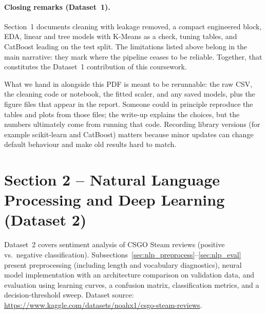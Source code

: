 \documentclass[12pt,a4paper]{article}
\begin{document}
\paragraph{Closing remarks (Dataset~1).}
Section~1 documents cleaning with leakage removed, a compact engineered block, EDA, linear and tree models with K-Means as a check, tuning tables, and CatBoost leading on the test split. The limitations listed above belong in the main narrative: they mark where the pipeline ceases to be reliable. Together, that constitutes the Dataset~1 contribution of this coursework.

What we hand in alongside this PDF is meant to be rerunnable: the raw CSV, the cleaning code or notebook, the fitted scaler, and any saved models, plus the figure files that appear in the report. Someone could in principle reproduce the tables and plots from those files; the write-up explains the choices, but the numbers ultimately come from running that code. Recording library versions (for example scikit-learn and CatBoost) matters because minor updates can change default behaviour and make old results hard to match.

\newpage
\pagestyle{secTwo}
\section{Section 2 -- Natural Language Processing and Deep Learning (Dataset 2)}

\noindent Dataset~2 covers sentiment analysis of CSGO Steam reviews (positive vs.\ negative classification). Subsections~\ref{sec:nlp_preprocess}--\ref{sec:nlp_eval} present preprocessing (including length and vocabulary diagnostics), neural model implementation with an architecture comparison on validation data, and evaluation using learning curves, a confusion matrix, classification metrics, and a decision-threshold sweep. Dataset source: \url{https://www.kaggle.com/datasets/noahx1/csgo-steam-reviews}.
\end{document}
